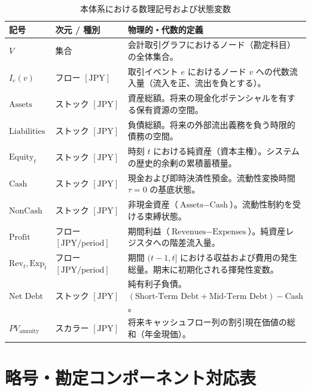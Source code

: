 \documentclass[11pt, a4paper]{report}
\begin{document}
\begin{table}[htbp]
\centering
\small
\begin{tabular}{llp{9.5cm}}
\toprule
\textbf{記号} & \textbf{次元 / 種別} & \textbf{物理的・代数的定義} \\
\midrule
$V$ & 集合 & 会計取引グラフにおけるノード（勘定科目）の全体集合。 \\
$I_e(v)$ & フロー $[\text{JPY}]$ & 取引イベント $e$ におけるノード $v$ への代数流入量（流入を正、流出を負とする）。 \\
$\text{Assets}$ & ストック $[\text{JPY}]$ & 資産総額。将来の現金化ポテンシャルを有する保有資源の空間。 \\
$\text{Liabilities}$ & ストック $[\text{JPY}]$ & 負債総額。将来の外部流出義務を負う時限的債務の空間。 \\
$\text{Equity}_t$ & ストック $[\text{JPY}]$ & 時刻 $t$ における純資産（資本主権）。システムの歴史的余剰の累積蓄積量。 \\
$\text{Cash}$ & ストック $[\text{JPY}]$ & 現金および即時決済性預金。流動性変換時間 $\tau = 0$ の基底状態。 \\
$\text{NonCash}$ & ストック $[\text{JPY}]$ & 非現金資産（$\text{Assets} - \text{Cash}$）。流動性制約を受ける束縛状態。 \\
$\text{Profit}$ & フロー $[\text{JPY}/\text{period}]$ & 期間利益（$\text{Revenues} - \text{Expenses}$）。純資産レジスタへの階差流入量。 \\
$\text{Rev}_t, \text{Exp}_t$ & フロー $[\text{JPY}/\text{period}]$ & 期間 $(t-1, t]$ における収益および費用の発生総量。期末に初期化される揮発性変数。 \\
$\text{Net Debt}$ & ストック $[\text{JPY}]$ & 純有利子負債。$(\text{Short-Term Debt} + \text{Mid-Term Debt}) - \text{Cash}$。 \\
$PV_{\text{annuity}}$ & スカラー $[\text{JPY}]$ & 将来キャッシュフロー列の割引現在価値の総和（年金現価）。 \\
\bottomrule
\end{tabular}
\caption{本体系における数理記号および状態変数}
\end{table}

\section{略号・勘定コンポーネント対応表}
\end{document}
